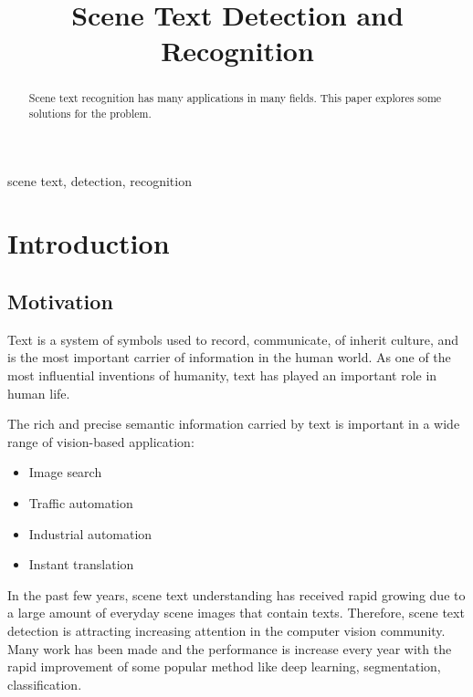 \documentclass[conference]{IEEEtran}
\begin{document}
\title{Scene Text Detection and Recognition}

\author{
\and
{}
}

\maketitle

\begin{abstract}
Scene text recognition has many applications in many fields. This paper explores some solutions for the problem.
\end{abstract}

\begin{IEEEkeywords}
scene text, detection, recognition
\end{IEEEkeywords}

\section{Introduction}

\subsection{Motivation}

Text is a system of symbols used to record, communicate, of inherit culture, and is the most important carrier of information in the human world. As one of the most influential inventions of humanity, text has played an important role in human life.

The rich and precise semantic information carried by text is important in a wide range of vision-based application:

\begin{itemize}
    \item Image search
    \item Traffic automation
    \item Industrial automation
    \item Instant translation
\end{itemize}

In the past few years, scene text understanding has received rapid growing due to a large amount of everyday scene images that contain texts. Therefore, scene text detection is attracting increasing attention in the computer vision community. Many work has been made and the performance is increase every year with the rapid improvement of some popular method like deep learning, segmentation, classification.
\end{document}
